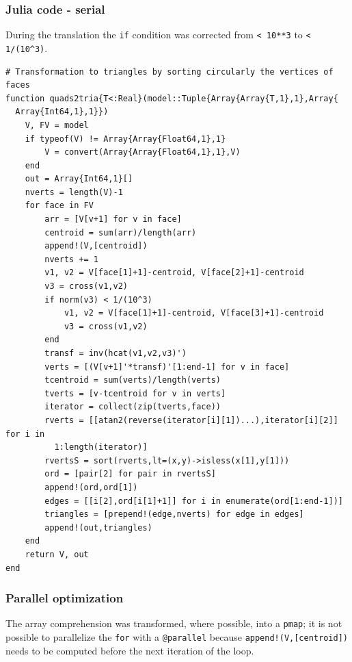 \documentclass[a4paper,12pt,titlepage]{article}					%
\begin{document}
\subsubsection{Julia code - serial}
During the translation the \texttt{if} condition was corrected from \texttt{< 10**3} to \texttt{< 1/(10\^{}3)}.

\begin{Verbatim}
# Transformation to triangles by sorting circularly the vertices of faces
function quads2tria{T<:Real}(model::Tuple{Array{Array{T,1},1},Array{
  Array{Int64,1},1}})
	V, FV = model
	if typeof(V) != Array{Array{Float64,1},1}
		V = convert(Array{Array{Float64,1},1},V)
	end
	out = Array{Int64,1}[]
	nverts = length(V)-1
	for face in FV
		arr = [V[v+1] for v in face]
		centroid = sum(arr)/length(arr)
		append!(V,[centroid])
		nverts += 1
		v1, v2 = V[face[1]+1]-centroid, V[face[2]+1]-centroid
		v3 = cross(v1,v2)
		if norm(v3) < 1/(10^3)
			v1, v2 = V[face[1]+1]-centroid, V[face[3]+1]-centroid
			v3 = cross(v1,v2)
		end
		transf = inv(hcat(v1,v2,v3)')
		verts = [(V[v+1]'*transf)'[1:end-1] for v in face]
		tcentroid = sum(verts)/length(verts)
		tverts = [v-tcentroid for v in verts]
		iterator = collect(zip(tverts,face))
		rverts = [[atan2(reverse(iterator[i][1])...),iterator[i][2]] for i in
		  1:length(iterator)]
		rvertsS = sort(rverts,lt=(x,y)->isless(x[1],y[1]))
		ord = [pair[2] for pair in rvertsS]
		append!(ord,ord[1])
		edges = [[i[2],ord[i[1]+1]] for i in enumerate(ord[1:end-1])]
		triangles = [prepend!(edge,nverts) for edge in edges]
		append!(out,triangles)
	end
	return V, out
end
\end{Verbatim}

\subsubsection{Parallel optimization}
The array comprehension was transformed, where possible, into a \texttt{pmap}; it is not possible to parallelize the \texttt{for} with a \texttt{@parallel} because \texttt{append!(V,[centroid])} needs to be computed before the next iteration of the loop.
\end{document}
